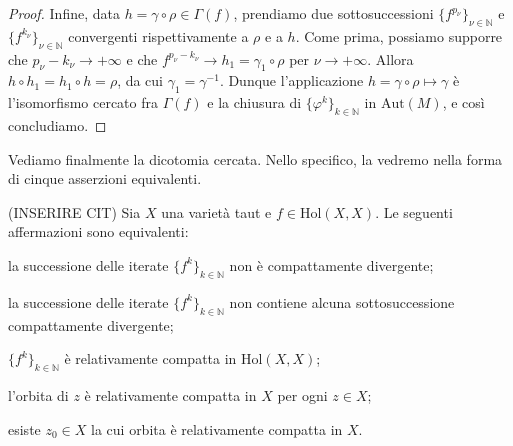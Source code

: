 \begin{proof}
    Infine, data $h=\gamma\circ\rho\in\Gamma(f)$, prendiamo due sottosuccessioni $\{f^{p_\nu}\}_{\nu\in\mathbb{N}}$ e $\{f^{k_\nu}\}_{\nu\in\mathbb{N}}$ convergenti rispettivamente a $\rho$ e a $h$. Come prima, possiamo supporre che $p_\nu-k_\nu \longrightarrow+\infty$ e che $f^{p_\nu-k_\nu} \longrightarrow h_1=\gamma_1\circ\rho$ per $\nu\longrightarrow+\infty$. Allora $h\circ h_1=h_1\circ h=\rho$, da cui $\gamma_1=\gamma^{-1}$. Dunque l'applicazione $h=\gamma\circ\rho\longmapsto\gamma$ è l'isomorfismo cercato fra $\Gamma(f)$ e la chiusura di $\{\varphi^k\}_{k\in\mathbb{N}}$ in $\text{Aut}(M)$, e così concludiamo.
\end{proof}

Vediamo finalmente la dicotomia cercata. Nello specifico, la vedremo nella forma di cinque asserzioni equivalenti.

\begin{thm} \label{dicotomia}
    (INSERIRE CIT) Sia $X$ una varietà taut e $f \in \text{Hol}(X,X)$. Le seguenti affermazioni sono equivalenti:
    \begin{nlist}
        \item la successione delle iterate $\{f^k\}_{k \in \mathbb{N}}$ non è compattamente divergente;
        \item la successione delle iterate $\{f^k\}_{k \in \mathbb{N}}$ non contiene alcuna sottosuccessione compattamente divergente;
        \item $\{f^k\}_{k \in \mathbb{N}}$ è relativamente compatta in $\text{Hol}(X,X)$;
        \item l'orbita di $z$ è relativamente compatta in $X$ per ogni $z \in X$;
        \item esiste $z_0 \in X$ la cui orbita è relativamente compatta in $X$.
    \end{nlist}
\end{thm}

